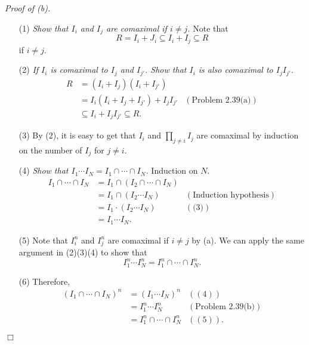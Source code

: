 \documentclass{article}
\begin{document}
\emph{Proof of (b).}
\begin{enumerate}
\item[(1)]
  \emph{Show that $I_i$ and $I_j$ are comaximal if $i \neq j$.}
  Note that
  \[
    R = I_i + J_i \subseteq I_i + I_j \subseteq R
  \]
  if $i \neq j$.

\item[(2)]
  \emph{If $I_i$ is comaximal to $I_j$ and $I_{j'}$.
  Show that $I_i$ is also comaximal to $I_j I_{j'}$.}
  \begin{align*}
    R
    &= (I_i + I_j)(I_i + I_{j'}) \\
    &= I_i(I_i + I_j + I_{j'}) + I_j I_{j'}
      &(\text{Problem 2.39(a)}) \\
    &\subseteq I_i + I_j I_{j'} \subseteq R.
  \end{align*}

\item[(3)]
  By (2), it is easy to get that $I_i$ and $\prod_{j \neq i} I_j$
  are comaximal by induction on the number of $I_j$ for $j \neq i$.

\item[(4)]
  \emph{Show that $I_1 \cdots I_N = I_1 \cap \cdots \cap I_N$.}
  Induction on $N$.
  \begin{align*}
    I_1 \cap \cdots \cap I_N
    &= I_1 \cap (I_2 \cap \cdots \cap I_N) \\
    &= I_1 \cap (I_2 \cdots I_N)
      &(\text{Induction hypothesis}) \\
    &= I_1 \cdot (I_2 \cdots I_N)
      &(\text{(3)}) \\
    &= I_1 \cdots I_N.
  \end{align*}

\item[(5)]
  Note that $I_i^n$ and $I_j^n$ are comaximal if $i \neq j$ by (a).
  We can apply the same argument in (2)(3)(4) to show that
  \[
    I_1^{n} \cdots I_N^{n} = I_1^{n} \cap \cdots \cap I_N^{n}.
  \]

\item[(6)]
  Therefore,
  \begin{align*}
    (I_1 \cap \cdots \cap I_N)^{n}
    &= (I_1 \cdots I_N)^{n}
      &((4)) \\
    &= I_1^{n} \cdots I_N^{n}
      &(\text{Problem 2.39(b)}) \\
    &= I_1^{n} \cap \cdots \cap I_N^{n}
      &((5)).
  \end{align*}
\end{enumerate}
$\Box$ \\\\
\end{document}

